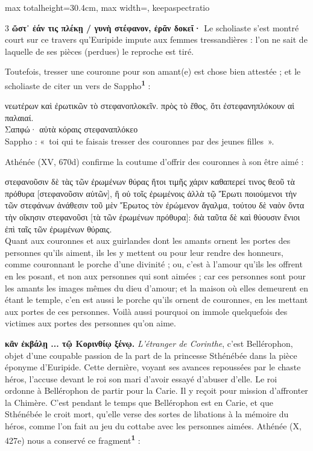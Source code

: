 \documentclass[11pt,twoside]{book}
\newcommand{\italique}[1]{\textit{#1}}
\newcommand{\citComm}[1]{\begin{quoting}[vskip=0.4pt,leftmargin=0.7em,rightmargin=0.2em]#1\end{quoting}}
\newcommand{\marqueur}[1]{\textsuperscript{\color{rubricRed}\textbf{#1}}}
\begin{document}
\begin{adjustbox}{max totalheight=30.4cm, max width=\textwidth, keepaspectratio}
\begin{minipage}{\textwidth}
{\begin{multicols}{3}
 \textbf{ὥστ᾽ ἐάν τις πλέκῃ / γυνὴ στέφανον, ἐρᾶν δοκεῖ·} Le scholiaste s'est montré court sur ce travers qu'Euripide impute aux femmes tressandières : l'on ne sait de laquelle de ses pièces (perdues) le reproche est tiré.
\par\vspace{1.5pt}
\noindent Toutefois, tresser une couronne pour son amant(e) est chose bien attestée ; et le scholiaste de citer un vers de Sappho\marqueur{1} :
\citComm{νεωτέρων καὶ ἐρωτικῶν τὸ στεφανοπλοκεῖν. πρὸς τὸ ἔθος, ὅτι ἐστεφανηπλόκουν αἱ παλαιαί.\\
Σαπφώ· αὐτὰ κόραις στεφαναπλόκεο\\
Sappho : «~toi qui te faisais tresser des couronnes par des jeunes filles~».}
\par\vspace{1.5pt}
\noindent Athénée (XV, 670d) confirme la coutume d'offrir des couronnes à son être aimé :
\citComm{στεφανοῦσιν δὲ τὰς τῶν ἐρωμένων θύρας ἤτοι τιμῆς χάριν καθαπερεί τινος θεοῦ τὰ πρόθυρα [στεφανοῦσιν αὐτῶν], ἢ οὐ τοῖς ἐρωμένοις ἀλλὰ τῷ Ἔρωτι ποιούμενοι τὴν τῶν στεφάνων ἀνάθεσιν τοῦ μὲν Ἔρωτος τὸν ἐρώμενον ἄγαλμα, τούτου δὲ ναὸν ὄντα τὴν οἴκησιν στεφανοῦσι [τὰ τῶν ἐρωμένων πρόθυρα]: διὰ ταῦτα δὲ καὶ θύουσιν ἔνιοι ἐπὶ ταῖς τῶν ἐρωμένων θύραις.\\
Quant aux couronnes et aux guirlandes dont les amants ornent les portes des personnes qu'ils aiment, ils les y mettent ou pour leur rendre des honneurs, comme couronnant le porche d'une divinité ; ou, c'est à l'amour qu'ils les offrent en les posant, et non aux personnes qui sont aimées ; car ces personnes sont pour les amants les images mêmes du dieu d'amour; et la maison où elles demeurent en étant le temple, c'en est aussi le porche qu'ils ornent de couronnes, en les mettant aux portes de ces personnes. Voilà aussi pourquoi on immole quelquefois des victimes aux portes des personnes qu'on aime.}
\par\vspace{1.5pt}
 \textbf{κἂν ἐκβάλῃ ... τῷ Κορινθίῳ ξένῳ.} \italique{L'étranger de Corinthe}, c'est Bellérophon, objet d'une coupable passion de la part de la princesse Sthénébée dans la pièce éponyme d'Euripide. Cette dernière, voyant ses avances repoussées par le chaste héros, l'accuse devant le roi son mari d'avoir essayé d'abuser d'elle. Le roi ordonne à Bellérophon de partir pour la Carie. Il y reçoit pour mission d'affronter la Chimère. C'est pendant le temps que Bellérophon est en Carie, et que Sthénébée le croit mort, qu'elle verse des sortes de libations à la mémoire du héros, comme l'on fait au jeu du cottabe avec les personnes aimées. Athénée (X, 427e) nous a conservé ce fragment\marqueur{1} :

\end{multicols}}
\end{minipage}
\end{adjustbox}
\end{document}
